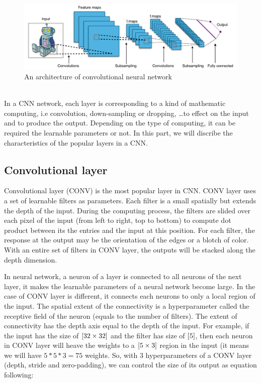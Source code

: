 \begin{figure}[h]
	\centering
	\includegraphics[scale=0.45]{images/cnn_architecture}
	\caption{An architecture of convolutional neural network}
	\label{figlncex}
\end{figure}~\\

In a CNN network, each layer is corresponding to a kind of mathematic computing, i.e convolution, down-sampling or dropping, \ldots to effect on the input and to produce the output. Depending on the type of computing, it can be required the learnable parameters or not. In this part, we will discribe the characteristics of the popular layers in a CNN.
\subsection{Convolutional layer}
Convolutional layer (CONV) is the most popular layer in CNN. CONV layer uses a set of learnable filters as parameters. Each filter is a small spatially but extends the depth of the input. During the computing process, the filters are slided over each pixel of the input (from left to right, top to bottom) to compute dot product between its the entries and the input at this position. For each filter, the response at the output may be the orientation of the edges or a blotch of color. With an entire set of filters in CONV layer, the outputs will be stacked along the depth dimension.

In neural network, a neuron of a layer is connected to all neurons of the next layer, it makes the learnable parameters of a neural network become large. In the case of CONV layer is different, it connects each neurons to only a local region of the input. The spatial extent of the connectivity is a hyperparameter called the receptive field of the neuron (equals to the number of filters). The extent of connectivity has the depth axis equal to the depth of the input. For example, if the input has the size of $[32 \times 32 \time 3]$ and the filter has size of $[5 \time 5]$, then each neuron in CONV layer will heave the weights to a $[5 \time 5 \times 3]$ region in the input (it means we will have $5 * 5 * 3  = 75$ weights. So, with 3 hyperparameters of a CONV layer (depth, stride and zero-padding), we can control the size of its output as equation following: 

